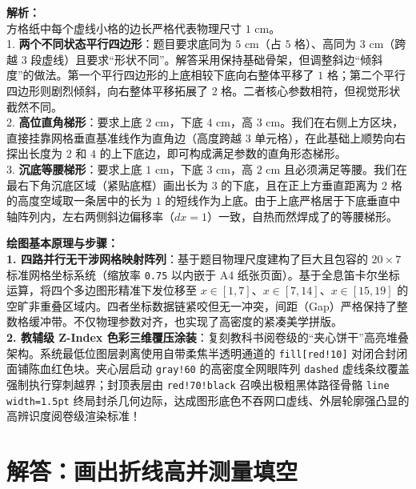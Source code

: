 {\small\color{gray}
\textbf{解析：}\\
方格纸中每个虚线小格的边长严格代表物理尺寸 $1\text{ cm}$。\\
1. \textbf{两个不同状态平行四边形}：题目要求底同为 $5\text{ cm}$（占 $5$ 格）、高同为 $3\text{ cm}$（跨越 $3$ 段虚线）且要求“形状不同”。解答采用保持基础骨架，但调整斜边“倾斜度”的做法。第一个平行四边形的上底相较下底向右整体平移了 $1$ 格；第二个平行四边形则剧烈倾斜，向右整体平移拓展了 $2$ 格。二者核心参数相符，但视觉形状截然不同。\\
2. \textbf{高位直角梯形}：要求上底 $2\text{ cm}$，下底 $4\text{ cm}$，高 $3\text{ cm}$。我们在右侧上方区块，直接挂靠网格垂直基准线作为直角边（高度跨越 $3$ 单元格），在此基础上顺势向右探出长度为 $2$ 和 $4$ 的上下底边，即可构成满足参数的直角形态梯形。\\
3. \textbf{沉底等腰梯形}：要求上底 $1\text{ cm}$，下底 $3\text{ cm}$，高 $2\text{ cm}$ 且必须满足等腰。我们在最右下角沉底区域（紧贴底框）画出长为 $3$ 的下底，且在正上方垂直距离为 $2$ 格的高度空域取一条居中的长为 $1$ 的短线作为上底。由于上底严格居于下底垂直中轴阵列内，左右两侧斜边偏移率（$dx=1$）一致，自热而然焊成了的等腰梯形。
}

\vspace{0.6cm}

{\small\color{blue!70!black}
\textbf{绘图基本原理与步骤：}\\
\textbf{1. 四路并行无干涉网格映射阵列}：基于题目物理尺度建构了巨大且包容的 $20 \times 7$ 标准网格坐标系统（缩放率 \texttt{0.75} 以内嵌于 A4 纸张页面）。基于全息笛卡尔坐标运算，将四个多边图形精准下发位移至 $x \in [1,7]$、$x \in [7,14]、x \in [15,19]$ 的空旷非重叠区域内。四者坐标数据链紧咬但无一冲突，间距（Gap）严格保持了整数格缓冲带。不仅物理参数对齐，也实现了高密度的紧凑美学拼版。\\
\textbf{2. 教辅级 Z-Index 色彩三维覆压涂装}：复刻教科书阅卷级的“夹心饼干”高亮堆叠架构。系统最低位图层剥离使用自带柔焦半透明通道的 \texttt{fill[red!10]} 对闭合封闭面铺陈血红色块。夹心层启动 \texttt{gray!60} 的高密度全网眼阵列 \texttt{dashed} 虚线条纹覆盖强制执行穿刺越界；封顶表层由 \texttt{red!70!black} 召唤出极粗黑体路径骨骼 \texttt{line width=1.5pt} 终局封杀几何边际，达成图形底色不吞网口虚线、外层轮廓强凸显的高辨识度阅卷级渲染标准！
}


\newpage



\section{解答：画出折线高并测量填空}

